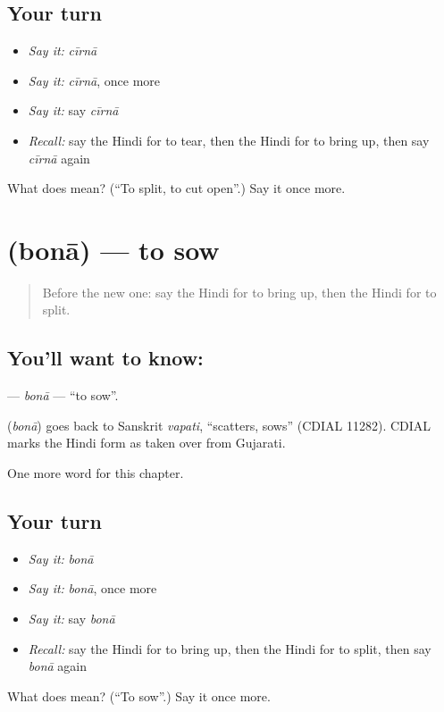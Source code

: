 \subsection*{Your turn}
\begin{itemize}
\raggedright
  \item \emph{Say it:} \emph{cīrnā}
  \item \emph{Say it:} \emph{cīrnā}, once more
  \item \emph{Say it:} say \emph{cīrnā}
  \item \emph{Recall:} say the Hindi for to tear, then the Hindi for to bring up, then say \emph{cīrnā} again
\end{itemize}

\begin{tcolorbox}[breakable,colback=teal!4,colframe=teal!35!black,title={Before you move on}]
What does  mean? (\textquotedblleft{}To split, to cut open\textquotedblright{}.) Say it once more.
\end{tcolorbox}
\section[\texorpdfstring{\hi{बोना} (bonā)}{बोना (bonā)}]{ (bonā) — to sow}

\label{lesson:HI-C227-bona}



\begin{quote}
Before the new one: say the Hindi for to bring up, then the Hindi for to split.
\end{quote}

\subsection*{You'll want to know: }
\textbf{} — \emph{bonā} — \textquotedblleft{}to sow\textquotedblright{}.

\begin{cousinweb}
\textbf{} (\emph{bonā}) goes back to Sanskrit \emph{vapati}, \textquotedblleft{}scatters, sows\textquotedblright{} (CDIAL 11282). CDIAL marks the Hindi form as taken over from Gujarati.
\end{cousinweb}

\begin{grammarlens}[title={What you've built}]
One more word for this chapter.
\end{grammarlens}

\subsection*{Your turn}
\begin{itemize}
\raggedright
  \item \emph{Say it:} \emph{bonā}
  \item \emph{Say it:} \emph{bonā}, once more
  \item \emph{Say it:} say \emph{bonā}
  \item \emph{Recall:} say the Hindi for to bring up, then the Hindi for to split, then say \emph{bonā} again
\end{itemize}

\begin{tcolorbox}[breakable,colback=teal!4,colframe=teal!35!black,title={Before you move on}]
What does  mean? (\textquotedblleft{}To sow\textquotedblright{}.) Say it once more.
\end{tcolorbox}

